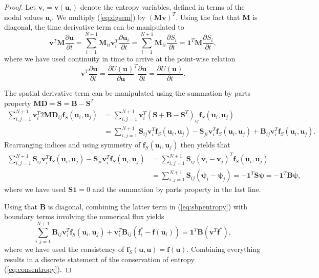 \documentclass[preprint,10pt]{article}
\theoremstyle{definition}
\theoremstyle{lemma}
\theoremstyle{theorem}
\theoremstyle{assumption}
\newcommand{\pd}[2]{\frac{\partial#1}{\partial#2}}
\newcommand{\LRp}[1]{\left( #1 \right)}
\begin{document}
\begin{proof}
Let $\bm{v}_i = \bm{v}(\bm{u}_i)$ denote the entropy variables, defined in terms of the nodal values $\bm{u}_i$.  We multiply (\ref{eq:dgsem}) by $\LRp{\bm{M}\bm{v}}^T$.  
Using the fact that $\bm{M}$ is diagonal, the time derivative term can be manipulated to 
\[
\bm{v}^T\bm{M}\pd{\bm{u}}{t} = \sum_{i=1}^{N+1} \bm{M}_{ii} \bm{v}_i^T \pd{\bm{u}_i}{t} = \sum_{i=1}^{N+1} \bm{M}_{ii} \pd{S_i}{t} = \bm{1}^T\bm{M}\pd{S_i}{t},
\]
where we have used continuity in time to arrive at the point-wise relation 
\[
\bm{v}^T \pd{\bm{u}}{t} = \pd{U(\bm{u})}{\bm{u}}^T \pd{\bm{u}}{t} = \pd{U(\bm{u})}{t}.
\]

The spatial derivative term can be manipulated using the summation by parts property $\bm{M}\bm{D} = \bm{S} = \bm{B}-\bm{S}^T$
\begin{align}
\sum_{i,j=1}^{N+1} \bm{v}_i^T 2 \bm{M}\bm{D}_{ij}\bm{f}_S(\bm{u}_i,\bm{u}_j) &= \sum_{i,j=1}^{N+1} \bm{v}_i^T (\bm{S} + \bm{B} - \bm{S}^T)_{ij}\bm{f}_S(\bm{u}_i,\bm{u}_j) \nonumber\\
&= \sum_{i,j=1}^{N+1} \bm{S}_{ij}\bm{v}_i^T \bm{f}_S(\bm{u}_i,\bm{u}_j) - \bm{S}_{ji}\bm{v}_i^T \bm{f}_S(\bm{u}_i,\bm{u}_j) + \bm{B}_{ij}\bm{v}_i^T \bm{f}_S(\bm{u}_i,\bm{u}_j). \label{eq:sbpentropy}
\end{align}
Rearranging indices and using symmetry of $\bm{f}_S(\bm{u}_i,\bm{u}_j)$ then yields that
\begin{align*}
\sum_{i,j=1}^{N+1} \bm{S}_{ij}\bm{v}_i^T \bm{f}_S(\bm{u}_i,\bm{u}_j) - \bm{S}_{ji}\bm{v}_i^T \bm{f}_S(\bm{u}_i,\bm{u}_j) &= \sum_{i,j=1}^{N+1} \bm{S}_{ij} \LRp{\bm{v}_i - \bm{v}_j}^T\bm{f}_S(\bm{u}_i,\bm{u}_j)\\
&= \sum_{i,j=1}^{N+1} \bm{S}_{ij} \LRp{\bm{\psi}_i-\bm{\psi}_j} = -\bm{1}^T \bm{S}\bm{\psi} = -\bm{1}^T\bm{B}\bm{\psi},
\end{align*}
where we have used $\bm{S}\bm{1} = 0$ and the summation by parts property in the last line.  

Using that $\bm{B}$ is diagonal, combining the latter term in (\ref{eq:sbpentropy}) with boundary terms involving the numerical flux yields
\[
\sum_{i,j = 1}^{N+1} \bm{B}_{ij}\bm{v}_i^T \bm{f}_S(\bm{u}_i,\bm{u}_j) + \bm{v}_i^T\bm{B}_{ij}\LRp{\bm{f}_i^* - \bm{f}(\bm{u}_i)} = \bm{1}^T\bm{B} \LRp{\bm{v}^T \bm{f}^*},
\]
where we have used the consistency of $\bm{f}_S(\bm{u},\bm{u}) = \bm{f}(\bm{u})$.  Combining everything results in a discrete statement of the conservation of entropy (\ref{eq:consentropy}).   
\end{proof}
\end{document}
